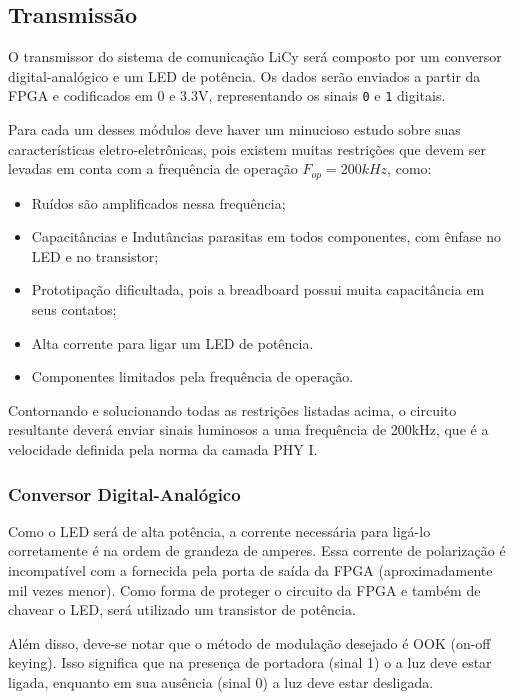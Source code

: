 	\subsection{Transmissão}
	
	O transmissor do sistema de comunicação LiCy será composto por um conversor digital-analógico e um LED de potência. Os dados serão enviados a partir da FPGA e codificados em 0 e 3.3V, representando os sinais \texttt{0} e \texttt{1} digitais. 
	
	Para cada um desses módulos deve haver um minucioso estudo sobre suas características eletro-eletrônicas, pois existem muitas restrições que devem ser levadas em conta com a frequência de operação $F_{op} = 200 kHz$, como:
	
	\begin{itemize}  
		\item Ruídos são amplificados nessa frequência;
		\item Capacitâncias e Indutâncias parasitas em todos componentes, com ênfase no LED e no transistor;
		\item Prototipação dificultada, pois a breadboard possui muita capacitância em seus contatos;
		\item Alta corrente para ligar um LED de potência.
		\item Componentes limitados pela frequência de operação.
	\end{itemize}
	
	Contornando e solucionando todas as restrições listadas acima, o circuito resultante deverá enviar sinais luminosos a uma frequência de 200kHz, que é a velocidade definida pela norma da camada PHY I.
	
	\subsubsection{Conversor Digital-Analógico}\label{method-hardware-conv-da}
	Como o LED será de alta potência, a corrente necessária para ligá-lo corretamente é na ordem de grandeza de amperes. Essa corrente de polarização é incompatível com a fornecida pela porta de saída da FPGA (aproximadamente mil vezes menor). Como forma de proteger o circuito da FPGA e também de chavear o LED, será utilizado um transistor de potência.
	
	Além disso, deve-se notar que o método de modulação desejado é OOK (on-off keying). Isso significa que na presença de portadora (sinal 1) o a luz deve estar ligada, enquanto em sua ausência (sinal 0) a luz deve estar desligada.
	
